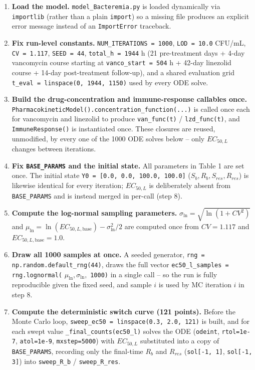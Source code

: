 \documentclass[11pt]{article}
\begin{document}
\begin{enumerate}
\item \textbf{Load the model.} \texttt{model\_Bacteremia.py} is loaded
dynamically via \texttt{importlib} (rather than a plain \texttt{import}) so
a missing file produces an explicit error message instead of an
\texttt{ImportError} traceback.

\item \textbf{Fix run-level constants.} \texttt{NUM\_ITERATIONS = 1000},
\texttt{LOD = 10.0} CFU/mL, \texttt{CV = 1.117}, \texttt{SEED = 44},
\texttt{total\_h = 1944} h (21 pre-treatment days + 4-day vancomycin course
starting at \texttt{vanco\_start = 504} h + 42-day linezolid course + 14-day
post-treatment follow-up), and a shared evaluation grid
\texttt{t\_eval = linspace(0, 1944, 1150)} used by every ODE solve.

\item \textbf{Build the drug-concentration and immune-response callables
once.} \texttt{PharmacokineticModel().concentration\_function(...)} is
called once each for vancomycin and linezolid to produce \texttt{van\_func(t)}
/ \texttt{lzd\_func(t)}, and \texttt{ImmuneResponse()} is instantiated once.
These closures are reused, unmodified, by every one of the 1000 ODE solves
below -- only $EC_{50,L}$ changes between iterations.

\item \textbf{Fix \texttt{BASE\_PARAMS} and the initial state.} All
parameters in Table 1 are set once. The initial state
\texttt{Y0 = [0.0, 0.0, 100.0, 100.0]} ($S_b, R_b, S_{res}, R_{res}$) is
likewise identical for every iteration; $EC_{50,L}$ is deliberately absent
from \texttt{BASE\_PARAMS} and is instead merged in per-call (step 8).

\item \textbf{Compute the log-normal sampling parameters.}
$\sigma_{\ln} = \sqrt{\ln(1+CV^2)}$ and
$\mu_{\ln} = \ln(EC_{50,L,\mathrm{base}}) - \sigma_{\ln}^2/2$ are computed
once from $CV = 1.117$ and $EC_{50,L,\mathrm{base}} = 1.0$.

\item \textbf{Draw all 1000 samples at once.} A seeded generator,
\texttt{rng = np.random.default\_rng(44)}, draws the full vector
\texttt{ec50\_l\_samples = rng.lognormal(} $\mu_{\ln}, \sigma_{\ln},$
\texttt{1000)} in a single call -- so the run is fully reproducible given the
fixed seed, and sample $i$ is used by MC iteration $i$ in step 8.

\item \textbf{Compute the deterministic switch curve (121 points).} Before
the Monte Carlo loop, \texttt{sweep\_ec50 = linspace(0.3, 2.0, 121)} is
built, and for each swept value \texttt{\_final\_counts(ec50\_l)} solves the
ODE (\texttt{odeint}, \texttt{rtol=1e-7}, \texttt{atol=1e-9},
\texttt{mxstep=5000}) with $EC_{50,L}$ substituted into a copy of
\texttt{BASE\_PARAMS}, recording only the final-time $R_b$ and $R_{res}$
(\texttt{sol[-1, 1]}, \texttt{sol[-1, 3]}) into \texttt{sweep\_R\_b} /
\texttt{sweep\_R\_res}.


\end{enumerate}
\end{document}
